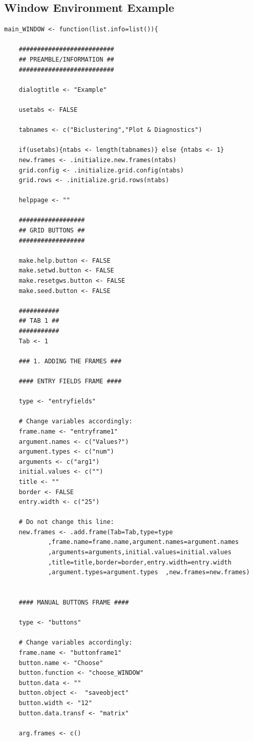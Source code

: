 \documentclass[a4paper]{article}\usepackage[]{graphicx}\usepackage[]{color}
\begin{document}
\subsection{Window Environment Example}
\begin{verbatim}
main_WINDOW <- function(list.info=list()){
	
	##########################
	## PREAMBLE/INFORMATION ##
	##########################
	
	dialogtitle <- "Example"
		
	usetabs <- FALSE
	
	tabnames <- c("Biclustering","Plot & Diagnostics")
	
	if(usetabs){ntabs <- length(tabnames)} else {ntabs <- 1}
	new.frames <- .initialize.new.frames(ntabs)
	grid.config <- .initialize.grid.config(ntabs)
	grid.rows <- .initialize.grid.rows(ntabs)
		
	helppage <- ""
		
	##################
	## GRID BUTTONS ##
	##################
	
	make.help.button <- FALSE
	make.setwd.button <- FALSE
	make.resetgws.button <- FALSE
	make.seed.button <- FALSE
	
	###########
	## TAB 1 ##
	###########
	Tab <- 1
	
	### 1. ADDING THE FRAMES ###
	
	#### ENTRY FIELDS FRAME ####
	
	type <- "entryfields"
	
	# Change variables accordingly:
	frame.name <- "entryframe1"  
	argument.names <- c("Values?") 
	argument.types <- c("num") 
	arguments <- c("arg1") 
	initial.values <- c("")
	title <- ""
	border <- FALSE
	entry.width <- c("25")
	
	# Do not change this line:
	new.frames <- .add.frame(Tab=Tab,type=type
			,frame.name=frame.name,argument.names=argument.names
			,arguments=arguments,initial.values=initial.values
			,title=title,border=border,entry.width=entry.width
			,argument.types=argument.types  ,new.frames=new.frames)
	

	#### MANUAL BUTTONS FRAME ####
	
	type <- "buttons"
	
	# Change variables accordingly:
	frame.name <- "buttonframe1"  
	button.name <- "Choose"  
	button.function <- "choose_WINDOW" 
	button.data <- "" 
	button.object <-  "saveobject" 
	button.width <- "12"
	button.data.transf <- "matrix" 
	
	arg.frames <- c()
	

\end{verbatim}
\end{document}
